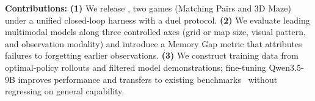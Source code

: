 
\noindent \textbf{Contributions:} \textbf{(1)} We release \benchname{}, two games (Matching Pairs and 3D Maze) under a unified closed-loop harness with a duel protocol. \textbf{(2)} We evaluate leading multimodal models along three controlled axes (grid or map size, visual pattern, and observation modality) and introduce a Memory Gap metric that attributes failures to forgetting earlier observations. \textbf{(3)} We construct training data from optimal-policy rollouts and filtered model demonstrations; fine-tuning Qwen3.5-9B improves \benchname{} performance and transfers to existing benchmarks~\citep{li2026emembench,ren2025vgrp} without regressing on general capability.